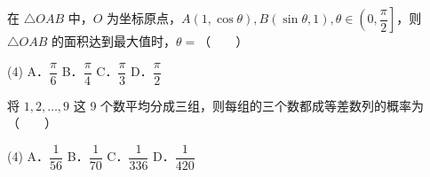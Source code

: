 \begin{question}
在 $\triangle OAB$ 中，$O$ 为坐标原点，$A(1, \cos\theta), B(\sin\theta, 1), \theta \in \left(0, \dfrac{\pi}{2}\right]$，则 $\triangle OAB$ 的面积达到最大值时，$\theta =$\mbox{（　　）}

\begin{gkopts}(4)
\task A．$\dfrac{\pi}{6}$
\task B．$\dfrac{\pi}{4}$
\task C．$\dfrac{\pi}{3}$
\task D．$\dfrac{\pi}{2}$
\end{gkopts}

\end{question}
\begin{question}
将 $1, 2, \dots, 9$ 这 9 个数平均分成三组，则每组的三个数都成等差数列的概率为\mbox{（　　）}

\begin{gkopts}(4)
\task A．$\dfrac{1}{56}$
\task B．$\dfrac{1}{70}$
\task C．$\dfrac{1}{336}$
\task D．$\dfrac{1}{420}$
\end{gkopts}

\end{question}

